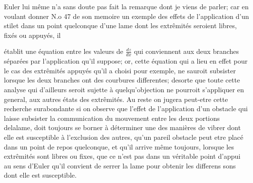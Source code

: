 \documentclass[11pt,a4paper]{article}
\begin{document}
Euler lui même n'a sans doute pas fait la remarque
dont je viens de parler; car en voulant donner N.o 47
de son memoire un exemple des effets de l'application
d'un stilet dans un point quelconque d'une lame
dont les extrêmités seroient libres, fixés ou appuyés, il


établit une équation entre les valeurs de $\frac{dz}{dx}$ qui conviennent
aux deux branches séparées par l'application qu'il suppose;
or, cette équation qui \struck{\ill{}} a lieu en effet pour le cas
des extrêmités appuyés qu'il a choisi pour exemple,
ne sauroit subsister lorsque les deux branches ont des
courbures differentes; desorte que toute cette analyse
qui d'ailleurs seroit sujette à quelqu'objection ne
pourroit s'appliquer en general, aux autres états
des extrêmités. Au reste on jugera peut-etre cette
recherche surabondante si on observe que
l'effet de l'application d'un obstacle 
qui laisse subsister la communication du mouvement
entre les deux portions delalame, doit toujours
se borner à déterminer une des manières de
vibrer dont elle est susceptible à l'exclusion
des autres, qu'un pareil obstacle peut etre placé
dans un point de repos quelconque, et qu'il arrive
même toujours, lorsque les extrêmités sont libres
ou fixes, que ce n'est pas dans un véritable
point d'appui au sens d'Euler qu'il convient
de serrer la lame pour obtenir les
differens sons dont elle est susceptible.

\end{document}
